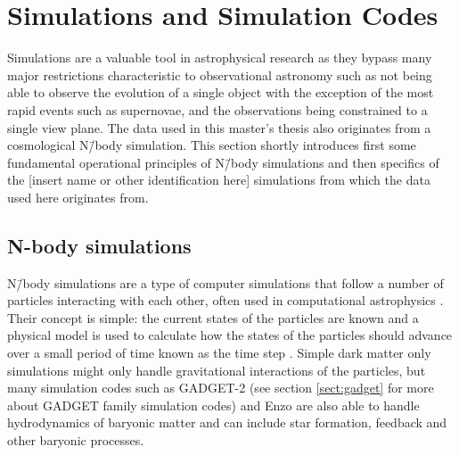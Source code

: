 \documentclass[english, oneside]{HYgradu}
\begin{document}





\chapter{Simulations and Simulation Codes}


Simulations are a valuable tool in astrophysical research as they bypass many major restrictions characteristic to observational astronomy such as not being able to observe the evolution of a single object with the exception of the most rapid events such as supernovae, and the observations being constrained to a single view plane. The data used in this master's thesis also originates from a cosmological N\=/body simulation. This section shortly introduces first some fundamental operational principles of N\=/body simulations and then specifics of the [insert name or other identification here] %
simulations from which the data used here originates from.


\section{N-body simulations}
N\=/body simulations are a type of computer simulations that follow a number of particles interacting with each other, often used in computational astrophysics \citep{binney2008galactic}. Their concept is simple: the current states of the particles are known and a physical model is used to calculate how the states of the particles should advance over a small period of time known as the time step \citep{binney2008galactic}. Simple dark matter only simulations might only handle gravitational interactions of the particles, but many simulation codes such as GADGET-2 \citep{springel2005cosmological} (see section \ref{sect:gadget} for more about GADGET family simulation codes) and Enzo \citep{norman2007simulating} are also able to handle hydrodynamics of baryonic matter and can include star formation, feedback and other baryonic processes.
\end{document}
